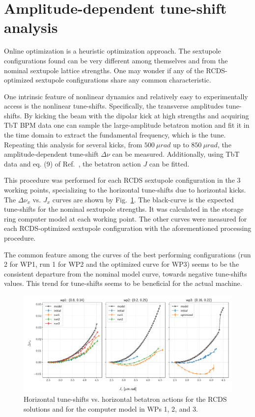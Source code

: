 \section{Amplitude-dependent tune-shift analysis}
Online optimization is a heuristic optimization approach. The sextupole configurations found can be very different among themselves and from the nominal sextupole lattice strengths. One may wonder if any of the RCDS-optimized sextupole configurations share any common characteristic.

One intrinsic feature of nonlinear dynamics and relatively easy to experimentally access is the nonlinear tune-shifts. Specifically, the transverse amplitudes tune-shifts. By kicking the beam with the dipolar kick at high strengths and acquiring TbT BPM data one can sample the large-amplitude betatron motion and fit it in the time domain to extract the fundamental frequency, which is the tune. Repeating this analysis for  several kicks, from $500~\unit{\mu rad}$ up to $850~\unit{\mu rad}$, the amplitude-dependent tune-shift $\Delta\nu$ can be measured. Additionally, using TbT data and eq. (9) of Ref.~\cite{resende_equilibrium_2021}, the betatron action $J$ can be fitted.

This procedure was performed for each RCDS sextupole configuration in the 3 working points, specializing to the horizontal tune-shifts due to horizontal kicks. The $\Delta \nu_x$ vs. $J_x$ curves are shown by Fig.~\ref{fig:adts}. The black-curve is the expected tune-shifts for the nominal sextupole strengths. It was calculated in the storage ring computer model at each working point. The other curves were measured for each RCDS-optimized sextupole configuration with the aforementioned processing procedure.

The common feature among the curves of the best performing configurations (run 2 for WP1, run 1 for WP2 and the optimized curve for WP3) seems to be the consistent departure from the nominal model curve, towards negative tune-shifts values. This trend for tune-shifts seems to be beneficial for the actual machine.
\begin{figure}[htb]
    \includegraphics[width=\columnwidth]{Images/opt_configs_dtunes.pdf}
    \caption[Horizontal tune-shifts vs. horizontal betatron actions for the RCDS solutions and for the computer model in WPs 1, 2, and 3.]{Horizontal tune-shifts vs. horizontal betatron actions for the RCDS solutions and for the computer model in WPs 1, 2, and 3.}
    \label{fig:adts}
\end{figure}
